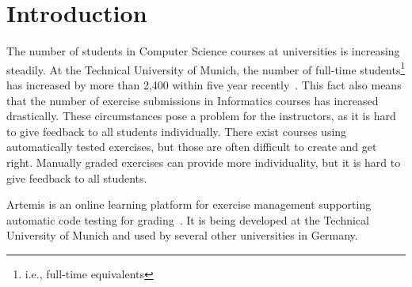 
\def\proposal{Proposal for}

\usepackage[nolist]{acronym}
\usepackage{csquotes}


\setlength{\evensidemargin}{22pt}
\setlength{\oddsidemargin}{22pt}



\lstset{showspaces=false, numbers=left, frame=single, basicstyle=\small}




\fancyhead{}
\pagestyle{fancy}
\fancyhead[LE]{\slshape \leftmark}
\fancyhead[RO]{\slshape \rightmark}
\headheight=15pt

\section*{Introduction}

The number of students in Computer Science courses at universities is increasing steadily. At the Technical University of Munich, the number of full-time students\footnote{i.e., full-time equivalents} has increased by more than 2,400 within five year recently~\cite{tumInZahlen2020}. This fact also means that the number of exercise submissions in Informatics courses has increased drastically.
These circumstances pose a problem for the instructors, as it is hard to give feedback to all students individually. There exist courses using automatically tested exercises, but those are often difficult to create and get right. Manually graded exercises can provide more individuality, but it is hard to give feedback to all students.

Artemis is an online learning platform for exercise management supporting automatic code testing for grading~\cite{ArTEMiS}. It is being developed at the Technical University of Munich and used by several other universities in Germany. 

